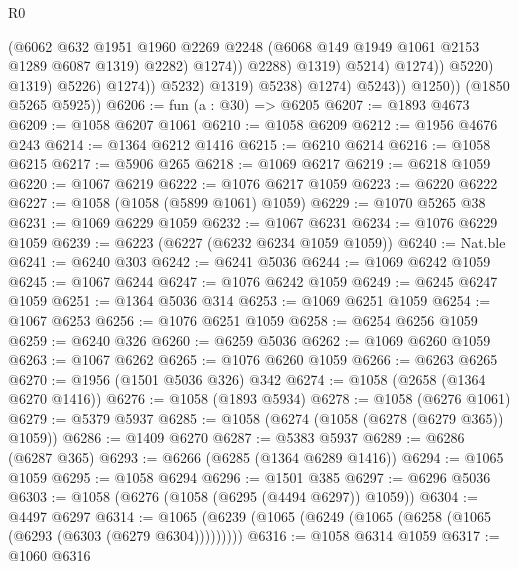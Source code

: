 \begin{lexlean}{R0}
\begin{coremodule}
                                              (@6062
                                                @632
                                                @1951
                                                @1960
                                                @2269
                                                @2248
                                                (@6068 @149 @1949 @1061 @2153 @1289 @6087 @1319)
                                                @2282)
                                              @1274))
                                          @2288)
                                        @1319)
                                      @5214)
                                    @1274))
                                @5220)
                              @1319)
                            @5226)
                          @1274))
                      @5232)
                    @1319)
                  @5238)
                @1274)
              @5243))
          @1250))
      (@1850 @5265 @5925))
@6206 := fun (a : @30) => @6205
@6207 := @1893 @4673
@6209 := @1058 @6207 @1061
@6210 := @1058 @6209
@6212 := @1956 @4676 @243
@6214 := @1364 @6212 @1416
@6215 := @6210 @6214
@6216 := @1058 @6215
@6217 := @5906 @265
@6218 := @1069 @6217
@6219 := @6218 @1059
@6220 := @1067 @6219
@6222 := @1076 @6217 @1059
@6223 := @6220 @6222
@6227 := @1058 (@1058 (@5899 @1061) @1059)
@6229 := @1070 @5265 @38
@6231 := @1069 @6229 @1059
@6232 := @1067 @6231
@6234 := @1076 @6229 @1059
@6239 := @6223 (@6227 (@6232 @6234 @1059 @1059))
@6240 := Nat.ble
@6241 := @6240 @303
@6242 := @6241 @5036
@6244 := @1069 @6242 @1059
@6245 := @1067 @6244
@6247 := @1076 @6242 @1059
@6249 := @6245 @6247 @1059
@6251 := @1364 @5036 @314
@6253 := @1069 @6251 @1059
@6254 := @1067 @6253
@6256 := @1076 @6251 @1059
@6258 := @6254 @6256 @1059
@6259 := @6240 @326
@6260 := @6259 @5036
@6262 := @1069 @6260 @1059
@6263 := @1067 @6262
@6265 := @1076 @6260 @1059
@6266 := @6263 @6265
@6270 := @1956 (@1501 @5036 @326) @342
@6274 := @1058 (@2658 (@1364 @6270 @1416))
@6276 := @1058 (@1893 @5934)
@6278 := @1058 (@6276 @1061)
@6279 := @5379 @5937
@6285 := @1058 (@6274 (@1058 (@6278 (@6279 @365)) @1059))
@6286 := @1409 @6270
@6287 := @5383 @5937
@6289 := @6286 (@6287 @365)
@6293 := @6266 (@6285 (@1364 @6289 @1416))
@6294 := @1065 @1059
@6295 := @1058 @6294
@6296 := @1501 @385
@6297 := @6296 @5036
@6303 := @1058 (@6276 (@1058 (@6295 (@4494 @6297)) @1059))
@6304 := @4497 @6297
@6314 := @1065 (@6239 (@1065 (@6249 (@1065 (@6258 (@1065 (@6293 (@6303 (@6279 @6304)))))))))
@6316 := @1058 @6314 @1059
@6317 := @1060 @6316

\end{coremodule}
\end{lexlean}
